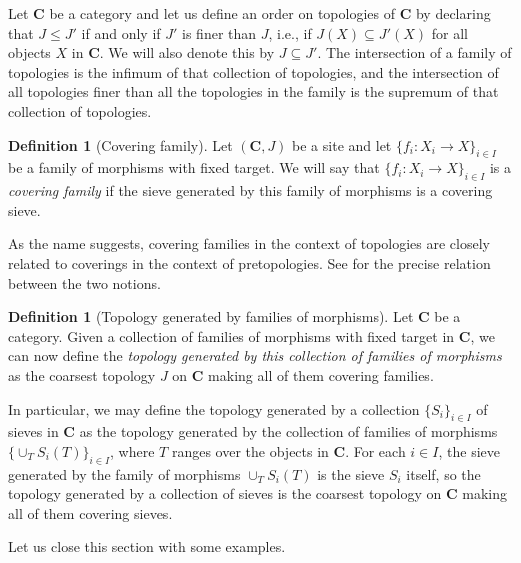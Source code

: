 \documentclass[12pt,reqno,a4paper]{amsart}
\theoremstyle{plain}
\theoremstyle{definition}
\newtheorem{defn}[thm]{Definition}
\theoremstyle{remark}
\begin{document}
Let $\mathbf{C}$ be a category and let us define an order on topologies of $\mathbf{C}$ by declaring that $J \leq J'$ if and only if $J'$ is finer than $J$, i.e., if $J(X) \subseteq J'(X)$ for all objects $X$ in $\mathbf{C}$.
We will also denote this by $J \subseteq J'$.
The intersection of a family of topologies is the infimum of that collection of topologies, and the intersection of all topologies finer than all the topologies in the family is the supremum of that collection of topologies.

\begin{defn}[Covering family]\label{defn:covering}
  Let $(\mathbf{C},J)$ be a site and let $\{ f_{i} \colon X_{i} \to X \}_{i \in I}$ be a family of morphisms with fixed target.
  We will say that $\{ f_{i} \colon X_{i} \to X \}_{i \in I}$ is a \textit{covering family} if the sieve generated by this family of morphisms is a covering sieve.
\end{defn}

As the name suggests, covering families in the context of topologies are closely related to coverings in the context of pretopologies.
See  for the precise relation between the two notions.

\begin{defn}[Topology generated by families of morphisms]\label{defn:generated}
  Let $\mathbf{C}$ be a category.
  Given a collection of families of morphisms with fixed target in $\mathbf{C}$, we can now define the \textit{topology generated by this collection of families of morphisms} as the coarsest topology $J$ on $\mathbf{C}$ making all of them covering families.
\end{defn}

In particular, we may define the topology generated by a collection $\{ S_{i} \}_{i \in I}$ of sieves in $\mathbf{C}$ as the topology generated by the collection of families of morphisms $\{ \cup_{T} S_{i}(T) \}_{i \in I}$, where $T$ ranges over the objects in $\mathbf{C}$.
For each $i \in I$, the sieve generated by the family of morphisms $\cup_{T} S_{i}(T)$ is the sieve $S_{i}$ itself, so the topology generated by a collection of sieves is the coarsest topology on $\mathbf{C}$ making all of them covering sieves.

Let us close this section with some examples.
\end{document}

